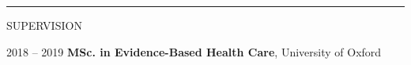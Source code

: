\documentclass[10pt,a4paper]{article}
\begin{document}
\noindent\rule{\textwidth}{0.4pt}
\begin{cvlist}{SUPERVISION}
	
	\item[2018 -- 2019]
	\textbf{MSc. in Evidence-Based Health Care}, University of Oxford
	
\end{cvlist}


\begin{comment}
\noindent\rule{\textwidth}{0.4pt}
\begin{cvlist}{EMPLOYMENT}
	
	\item[2019 -- Present]
	\textbf{Nuffield Dept Population Health}, University of Oxford \\
	\textit{Statistician}
	
	\item[2015 -- 2019]
	\textbf{Nuffield Dept Primary Care Health Sciences}, University of Oxford \\
	\textit{Statistician}
	
	\item[2011 -- 2012]
	\textbf{Phoenix Property Services}, Gloucester \\
	\textit{Owner}
	
	\item[2009 -- 2010]
	\textbf{Staples}, Gloucester \\
	\textit{Inventory Team Leader}
	
	\item[2008 -- 2009]
	\textbf{Phil \& Ben\ldots The Bathroom Men}, Tewkesbury \\
	\textit{Co-Owner}
	
\end{cvlist}
\end{comment}


\end{document}
